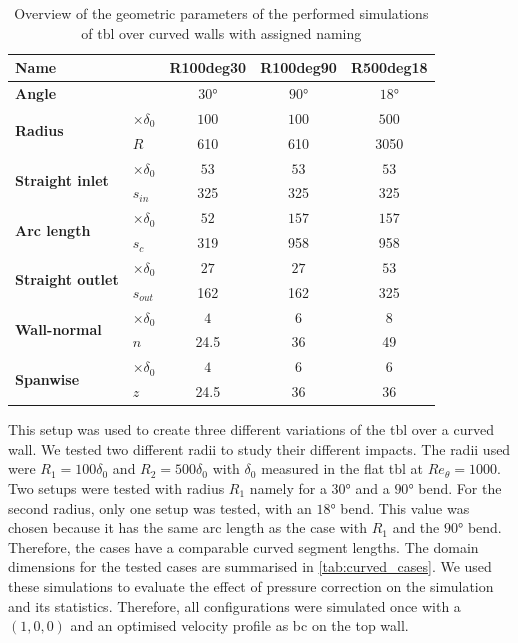 \begin{table}[!ht]
    \centering
    \caption{Overview of the geometric parameters of the performed simulations of \acrshort{tbl} over curved walls with assigned naming}
    \label{tab:curved_cases}
    \begin{tabular}{l l c c c}
    \hline
    \textbf{Name} & & \textbf{R100deg30} & \textbf{R100deg90} & \textbf{R500deg18} \\
    \hline
    \multicolumn{2}{l}{\textbf{Angle}} & $30$° & $90$° & $18$° \\
    \hline
    \multirow{2}{*}{\textbf{Radius}} & $\times \delta_{0}$ & $100$ & $100$ & $500$ \\
     & $R$ & 610 & 610 & 3050 \\
    \hline
    \multirow{2}{*}{\textbf{Straight inlet}} & $\times \delta_{0}$ & $53$ & $53$ & $53$ \\
     & $s_{in}$ & 325 & 325 & 325 \\
    \hline
    \multirow{2}{*}{\textbf{Arc length}} & $\times \delta_{0}$ & $52$ & $157$ & $157$ \\
     & $s_c$ & 319 & 958 & 958 \\
    \hline
    \multirow{2}{*}{\textbf{Straight outlet}} & $\times \delta_{0}$ & $27$ & $27$ & $53$ \\
     & $s_{out}$ & 162 & 162 & 325 \\
    \hline
    \multirow{2}{*}{\textbf{Wall-normal }} & $\times \delta_{0}$ & $4$ & $6$ & $8$ \\
     & $n$ & 24.5 & 36 & 49 \\
    \hline
    \multirow{2}{*}{\textbf{Spanwise }} & $\times \delta_{0}$ & $4$ & $6$ & $6$ \\
     & $z$ & 24.5 & 36 &  36\\
     \hline
    \end{tabular}
\end{table}

This setup was used to create three different variations of the \acrshort{tbl} over a curved wall.
We tested two different radii to study their different impacts. 
The radii used were $R_1 = 100\delta_{0}$ and $R_2 = 500\delta_{0}$ with $\delta_{0}$ measured in the flat \acrshort{tbl} at $Re_{\theta} = 1000$. 
Two setups were tested with radius $R_1$ namely for a $30$° and a $90$° bend. 
For the second radius, only one setup was tested, with an $18$° bend. 
This value was chosen because it has the same arc length as the case with $R_1$ and the $90$° bend. 
Therefore, the cases have a comparable curved segment lengths.
The domain dimensions for the tested cases are summarised in \autoref{tab:curved_cases}. 
We used these simulations to evaluate the effect of pressure correction on the simulation and its statistics.
Therefore, all configurations were simulated once with a $(1,0,0)$ and an optimised velocity profile as \acrshort{bc} on the top wall.


